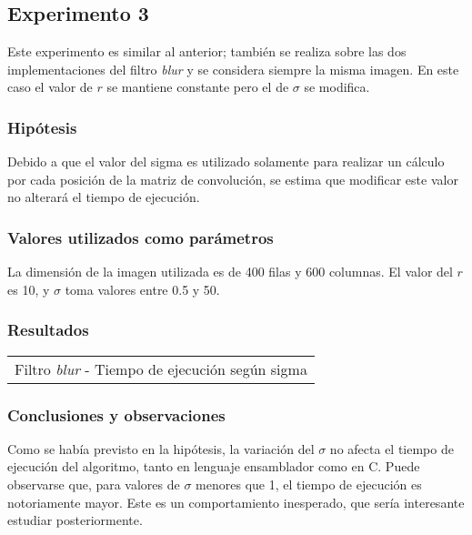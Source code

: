 	\subsection{Experimento 3}
		Este experimento es similar al anterior; también se realiza sobre las dos implementaciones del filtro \emph{blur} y se considera siempre la misma imagen. En este caso el valor de $r$ se mantiene constante pero el de $\sigma$ se modifica.

			\subsubsection*{Hipótesis} 
				Debido a que el valor del sigma es utilizado solamente para realizar un cálculo por cada posición de la matriz de convolución, se estima que modificar este valor no alterará el tiempo de ejecución.

			\subsubsection*{Valores utilizados como parámetros} 
				La dimensión de la imagen utilizada es de 400 filas y 600 columnas. El valor del $r$ es 10, y $\sigma$ toma valores entre 0.5 y 50.

			\subsubsection*{Resultados}

			{\centering \begin{tabular}{c}
	      		{\small Filtro \emph{blur} - Tiempo de ejecución según sigma} \\
	    		\end{tabular}}

			\subsubsection*{Conclusiones y observaciones}
				Como se había previsto en la hipótesis, la variación del $\sigma$ no afecta el tiempo de ejecución del algoritmo, tanto en lenguaje ensamblador como en C. Puede observarse que, para valores de $\sigma$ menores que 1, el tiempo de ejecución es notoriamente mayor. Este es un comportamiento inesperado, que sería interesante estudiar posteriormente.

